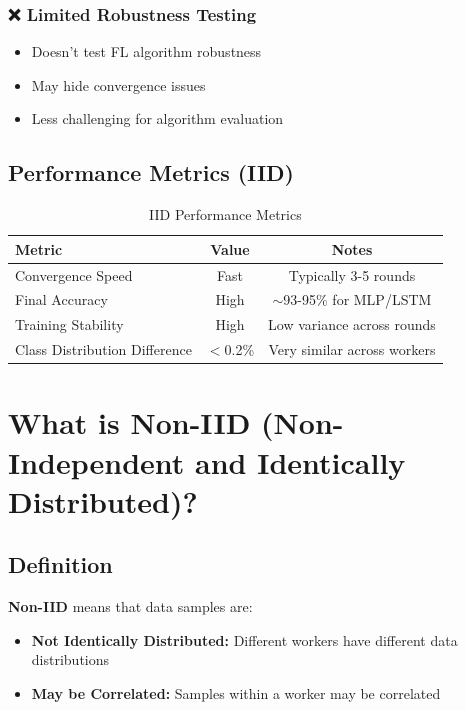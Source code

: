 \documentclass[12pt,a4paper]{article}
\begin{document}
\subsubsection{❌ Limited Robustness Testing}
\begin{itemize}
    \item Doesn't test FL algorithm robustness
    \item May hide convergence issues
    \item Less challenging for algorithm evaluation
\end{itemize}

\subsection{Performance Metrics (IID)}

\begin{table}[h]
\centering
\begin{tabular}{@{}lcc@{}}
\toprule
\textbf{Metric} & \textbf{Value} & \textbf{Notes} \\
\midrule
Convergence Speed & Fast & Typically 3-5 rounds \\
Final Accuracy & High & $\sim$93-95\% for MLP/LSTM \\
Training Stability & High & Low variance across rounds \\
Class Distribution Difference & $<$0.2\% & Very similar across workers \\
\bottomrule
\end{tabular}
\caption{IID Performance Metrics}
\end{table}

\section{What is Non-IID (Non-Independent and Identically Distributed)?}

\subsection{Definition}

\textbf{Non-IID} means that data samples are:
\begin{itemize}
    \item \textbf{Not Identically Distributed:} Different workers have different data distributions
    \item \textbf{May be Correlated:} Samples within a worker may be correlated
\end{itemize}
\end{document}
